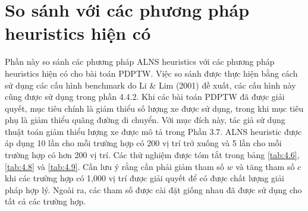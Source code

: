 \section{So sánh với các phương pháp heuristics hiện có}
Phần này so sánh các phương pháp ALNS heuristics với các phương pháp heuristics hiện có cho bài toán PDPTW. Việc so sánh được thực hiện bằng cách sử dụng các cấu hình benchmark do Li \& Lim (2001) đề xuất, các cấu hình này cũng được sử dụng trong phần 4.4.2. Khi các bài toán PDPTW đã được giải quyết, mục tiêu chính là giảm thiểu số lượng xe được sử dụng, trong khi mục tiêu phụ là giảm thiểu quãng đường di chuyển. Với mục đích này, tác giả sử dụng thuật toán giảm thiểu lượng xe được mô tả trong Phần 3.7. ALNS heuristic được áp dụng 10 lần cho mỗi trường hợp có 200 vị trí trở xuống và 5 lần cho mỗi trường hợp có hơn 200 vị trí. Các thử nghiệm được tóm tắt trong bảng \ref{tab:4.6}, \ref{tab:4.8} và \ref{tab:4.9}. Cần lưu ý rằng cần phải giảm tham số $w$ và tăng tham số $c$ khi các trường hợp có 1,000 vị trí được giải quyết để có được chất lượng giải pháp hợp lý. Ngoài ra, các tham số được cài đặt giống nhau đã được sử dụng cho tất cả các trường hợp.


